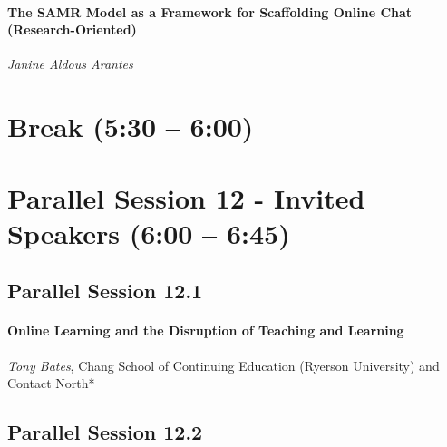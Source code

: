 \documentclass[
]{book}
\begin{document}
\begin{secondary}
\hypertarget{the-samr-model-as-a-framework-for-scaffolding-online-chat-research-oriented}{%
\paragraph{The SAMR Model as a Framework for Scaffolding Online Chat
(Research-Oriented)}\label{the-samr-model-as-a-framework-for-scaffolding-online-chat-research-oriented}}

\emph{Janine Aldous Arantes}
\end{secondary}

\hypertarget{break-530-600-1}{%
\section*{Break (5:30 -- 6:00)}\label{break-530-600-1}}

\hypertarget{parallel-session-12---invited-speakers-600-645}{%
\section*{Parallel Session 12 - Invited Speakers (6:00 -- 6:45)}\label{parallel-session-12---invited-speakers-600-645}}

\hypertarget{parallel-session-12.1}{%
\subsection*{Parallel Session 12.1}\label{parallel-session-12.1}}

\begin{wp}
\hypertarget{online-learning-and-the-disruption-of-teaching-and-learning}{%
\paragraph{Online Learning and the Disruption of Teaching and
Learning}\label{online-learning-and-the-disruption-of-teaching-and-learning}}

\emph{Tony Bates}, Chang School of Continuing Education (Ryerson
University) and Contact North*
\end{wp}

\hypertarget{parallel-session-12.2}{%
\subsection*{Parallel Session 12.2}\label{parallel-session-12.2}}
\end{document}
